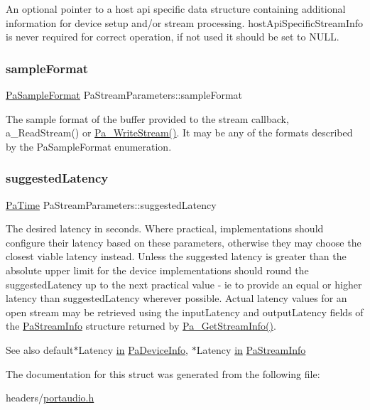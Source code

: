 An optional pointer to a host api specific data structure containing additional information for device setup and/or stream processing. host\+Api\+Specific\+Stream\+Info is never required for correct operation, if not used it should be set to N\+U\+LL. \mbox{\label{struct_pa_stream_parameters_ad8d2d3063757b812f9e5f8709f41052b}} 
\subsubsection{\texorpdfstring{sample\+Format}{sampleFormat}}
{\footnotesize\ttfamily \hyperlink{portaudio_8h_a4582d93c2c2e60e12be3d74c5fe00b96}{Pa\+Sample\+Format} Pa\+Stream\+Parameters\+::sample\+Format}

The sample format of the buffer provided to the stream callback, a\+\_\+\+Read\+Stream() or \hyperlink{portaudio_8h_a075a6efb503a728213bdae24347ed27d}{Pa\+\_\+\+Write\+Stream()}. It may be any of the formats described by the Pa\+Sample\+Format enumeration. \mbox{\label{struct_pa_stream_parameters_aa1e80ac0551162fd091db8936ccbe9a0}} 
\subsubsection{\texorpdfstring{suggested\+Latency}{suggestedLatency}}
{\footnotesize\ttfamily \hyperlink{portaudio_8h_af17a7e6d0471a23071acf8dbd7bbe4bd}{Pa\+Time} Pa\+Stream\+Parameters\+::suggested\+Latency}

The desired latency in seconds. Where practical, implementations should configure their latency based on these parameters, otherwise they may choose the closest viable latency instead. Unless the suggested latency is greater than the absolute upper limit for the device implementations should round the suggested\+Latency up to the next practical value -\/ ie to provide an equal or higher latency than suggested\+Latency wherever possible. Actual latency values for an open stream may be retrieved using the input\+Latency and output\+Latency fields of the \hyperlink{struct_pa_stream_info}{Pa\+Stream\+Info} structure returned by \hyperlink{portaudio_8h_a3d9c4cbda4e9f381b76f287c3de8a758}{Pa\+\_\+\+Get\+Stream\+Info()}. \begin{DoxySeeAlso}{See also}
default$\ast$\+Latency \hyperlink{_get_mic_8cpp_a5e0f598fffa03bb7026d3a2a168810db}{in} \hyperlink{struct_pa_device_info}{Pa\+Device\+Info}, $\ast$\+Latency \hyperlink{_get_mic_8cpp_a5e0f598fffa03bb7026d3a2a168810db}{in} \hyperlink{struct_pa_stream_info}{Pa\+Stream\+Info} 
\end{DoxySeeAlso}


The documentation for this struct was generated from the following file\+:\begin{DoxyCompactItemize}
\item 
headers/\hyperlink{portaudio_8h}{portaudio.\+h}\end{DoxyCompactItemize}
